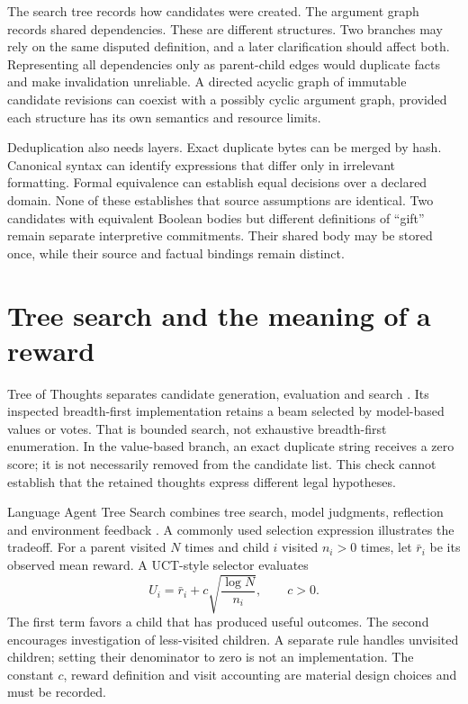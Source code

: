 The search tree records how candidates were created. The argument graph records
shared dependencies. These are different structures. Two branches may rely on
the same disputed definition, and a later clarification should affect both.
Representing all dependencies only as parent-child edges would duplicate facts
and make invalidation unreliable. A directed acyclic graph of immutable candidate
revisions can coexist with a possibly cyclic argument graph, provided each
structure has its own semantics and resource limits.

Deduplication also needs layers. Exact duplicate bytes can be merged by hash.
Canonical syntax can identify expressions that differ only in irrelevant
formatting. Formal equivalence can establish equal decisions over a declared
domain. None of these establishes that source assumptions are identical. Two
candidates with equivalent Boolean bodies but different definitions of ``gift''
remain separate interpretive commitments. Their shared body may be stored once,
while their source and factual bindings remain distinct.

\section{Tree search and the meaning of a reward}
\label{merge:M05:07}


Tree of Thoughts separates candidate generation, evaluation and search
\citep[section 3]{treeofthoughts2023}. Its inspected breadth-first implementation
retains a beam selected by model-based values or votes. That is bounded search,
not exhaustive breadth-first enumeration. In the value-based branch,
an exact duplicate string receives a zero score; it is not necessarily
removed from the candidate list. This check cannot establish that the
retained thoughts express different legal hypotheses.

Language Agent Tree Search combines tree search, model judgments, reflection and
environment feedback \citep[sections 3.2--4 and appendix A]{lats2024}. A commonly
used selection expression illustrates the tradeoff. For a parent visited $N$
times and child $i$ visited $n_i>0$ times, let $\bar r_i$ be its observed mean
reward. A UCT-style selector evaluates
\begin{equation}
 U_i=\bar r_i+c\sqrt{\frac{\log N}{n_i}},\qquad c>0.
 \label{eq:uct}
\end{equation}
The first term favors a child that has produced useful outcomes. The second
encourages investigation of less-visited children. A separate rule handles
unvisited children; setting their denominator to zero is not an implementation.
The constant $c$, reward definition and visit accounting are material design
choices and must be recorded.

